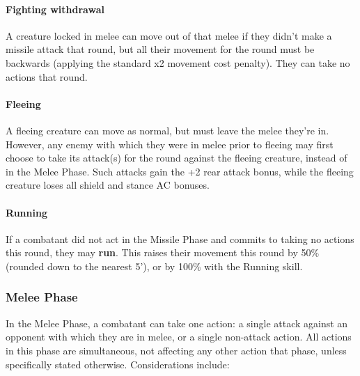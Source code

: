 \documentclass{article}
\begin{document}
\begin{multicols}{2}
\paragraph{Fighting withdrawal}\label{fighting-withdrawal}

A creature locked in melee can move out of that melee if they didn't
make a missile attack that round, but all their movement for the round
must be backwards (applying the standard x2 movement cost penalty). They
can take no actions that round.

\paragraph{Fleeing}\label{fleeing}

A fleeing creature can move as normal, but must leave the melee they're
in. However, any enemy with which they were in melee prior to fleeing
may first choose to take its attack(s) for the round against the fleeing
creature, instead of in the Melee Phase. Such attacks gain the +2 rear
attack bonus, while the fleeing creature loses all shield and stance AC
bonuses.

\paragraph{Running}\label{running}

If a combatant did not act in the Missile Phase and commits to taking no
actions this round, they may \textbf{run}. This raises their movement
this round by 50\% (rounded down to the nearest 5'), or by 100\% with
the Running skill.

\subsubsection{Melee Phase}\label{melee-phase}

In the Melee Phase, a combatant can take one action: a single attack
against an opponent with which they are in melee, or a single non-attack
action. All actions in this phase are simultaneous, not affecting any
other action that phase, unless specifically stated otherwise.
Considerations include:


\end{multicols}
\end{document}
